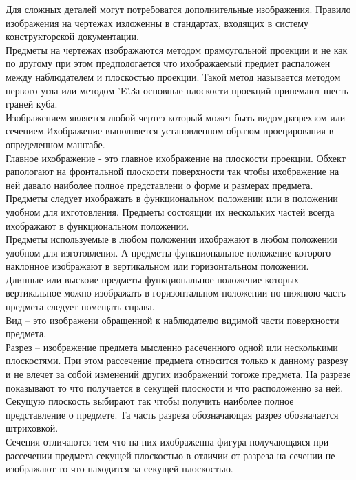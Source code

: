 \documentclass[a4paper, 12pt]{article}
\begin{document}
Для сложных деталей могут потребоватся дополнительные изображения. Правило изображения на чертежах изложенны в стандартах, входящих в систему конструкторской документации.\\

Предметы на чертежах изображаются методом прямоугольной проекции и не как по другому при этом предпологается что ихображаемый предмет распаложен между наблюдателем и плоскостью проекции. Такой метод называется методом первого угла или методом 'E'.За основные плоскости проекций принемают шесть граней куба.\\

Изображением является любой чертеэ который может быть видом,разрехзом или сечением.Ихображение выполняется установленном образом проецирования в определенном маштабе.\\

Главное ихображение - это главное ихображение на плоскости проекции. Обхект рапологают на фронтальной плоскости поверхности так чтобы ихображение на ней давало наиболее полное представлени о форме и размерах предмета.\\

Предметы следует ихображать в функциональном положении или в положении удобном для ихготовления. Предметы состоящии их нескольких частей всегда ихображают в функциональном положении.\\

Предметы используемые в любом положении ихображают в любом положении удобном для изготовления. А предметы функциональное положение которого наклонное изображают в вертикальном или горизонтальном положении.\\

Длинные или выскоие предметы функциональное положение которых вертикальное можно изображать в горизонтальном положении но нижнюю часть предмета следует помещать справа.\\

Вид -- это изображени обращенной к наблюдателю видимой части поверхности предмета.\\
Разрез -- изображение предмета мысленно расеченного одной или несколькими плоскостями. При этом рассечение предмета относится только к данному разрезу и не влечет за собой изменений других изображений тогоже предмета. На разрезе показывают то что получается в секущей плоскости и что расположенно за ней. Секущую плоскость выбирают так чтобы получить наиболее полное представление о предмете. Та часть разреза обозначающая разрез обозначается штриховкой.\\
Сечения отличаются тем что на них ихображенна фигура получающаяся при рассечении предмета секущей плоскостью в отличии от разреза на сечении не изображают то что находится за секущей плоскостью.\\
\end{document}
